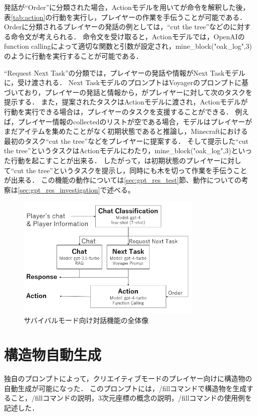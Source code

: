 発話が``Order''に分類された場合，Actionモデルを用いて{\mason}が命令を解釈した後，表\ref{tab:action}の行動を実行し，プレイヤーの作業を手伝うことが可能である．
Orderに分類されるプレイヤーの発話の例としては，``cut the tree''などの{\mason}に対する命令文が考えられる．
命令文を受け取ると，Actionモデルでは，OpenAIのfunction calling\cite{bib:function_calling}によって適切な関数と引数が設定され，mine\_block("oak\_log",3)のように行動を実行することが可能である．

``Request Next Task''の分類では，プレイヤーの発話や情報がNext Taskモデルに，受け渡される．
Next TaskモデルのプロンプトはVoyager\cite{bib:voyager}のプロンプトに基づいており，プレイヤーの発話と情報から，{\mason}がプレイヤーに対して次のタスクを提示する．
また，提案されたタスクはActionモデルに渡され，Actionモデルが行動を実行できる場合は，プレイヤーのタスクを支援することができる．
例えば，プレイヤー情報のcollectedのリストが空である場合，モデルはプレイヤーがまだアイテムを集めたことがなく初期状態であると推論し，Minecraftにおける最初のタスク``cut the tree''などをプレイヤーに提案する．
そして提示した``cut the tree''というタスクはActionモデルにわたり，mine\_block("oak\_log",3)といった行動を起こすことが出来る．
したがって，{\mason}は初期状態のプレイヤーに対して``cut the tree''というタスクを提示し，同時に{\mason}も木を切って作業を手伝うことが出来る．
この機能の動作については\ref{sec:gpt_res_test}節、動作についての考察は\ref{sec:gpt_res_investigation}で述べる。

\begin{figure}[H]
    \centering
    \includegraphics[width=0.8\textwidth]{fig/interactive_function.PNG}
    \caption{サバイバルモード向け対話機能の全体像}
    \label{fig:interactive_function}
\end{figure}

\section{構造物自動生成}\label{sec:build_mode}
独自のプロンプトによって，クリエイティブモードのプレイヤー向けに構造物の自動生成が可能になった．
このプロンプトには，/fillコマンドで構造物を生成すること，/fillコマンドの説明，3次元座標の概念の説明，/fillコマンドの使用例を記述した．

